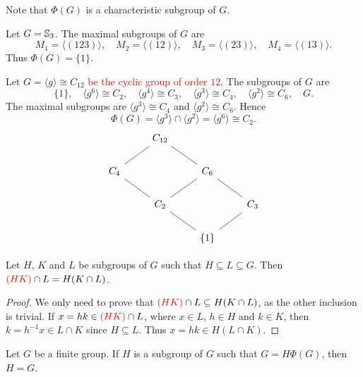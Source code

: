 Note that $\Phi(G)$ is a characteristic subgroup of $G$.


\begin{example}
	Let $G=\mathbb{S}_3$. The maximal subgroups of $G$ are 
	\[
	M_1=\langle (123)\rangle,
	\quad
	M_2=\langle (12)\rangle,
	\quad
	M_3=\langle (23)\rangle,
	\quad
	M_4=\langle (13)\rangle.
	\]
	Thus 
	$\Phi(G)=\{1\}$. 
\end{example}

\begin{example}
	Let $G=\langle g\rangle\cong C_{12}$ \textcolor{red}{be the cyclic group of order $12$}. The subgroups of $G$ are  
	\[
	\{1\},\quad
	\langle g^6\rangle\cong C_2,\quad
	\langle g^4\rangle\cong C_3,\quad
	\langle g^3\rangle\cong C_4,\quad
	\langle g^2\rangle\cong C_6,\quad
	G.
	\]
	The maximal subgroups are $\langle g^3\rangle\cong C_4$ and $\langle
	g^2\rangle\cong C_6$. Hence \[
	\Phi(G)=\langle g^3\rangle\cap \langle
	g^2\rangle=\langle g^6\rangle\cong C_2.
	\] 
\[\begin{tikzcd}
	& {C_{12}} \\
	{C_4} && {C_6} \\
	& {C_2} && {C_3} \\
	&& {\{1\}}
	\arrow[no head, from=4-3, to=3-2]
	\arrow[no head, from=4-3, to=3-4]
	\arrow[no head, from=3-4, to=2-3]
	\arrow[no head, from=2-3, to=1-2]
	\arrow[no head, from=3-2, to=2-1]
	\arrow[no head, from=2-1, to=1-2]
	\arrow[no head, from=3-2, to=2-3]
\end{tikzcd}\]
\end{example}


\begin{lemma}[Dedekind]
	\label{lem:Dedekind}
	Let $H$, $K$ and $L$ be subgroups of $G$ such that $H\subseteq L\subseteq G$. Then
	$\textcolor{red}{(HK)}\cap L=H(K\cap L)$.
\end{lemma}

\begin{proof}
	We only need to prove that $\textcolor{red}{(HK)}\cap L\subseteq H(K\cap L)$, 
	as the other inclusion is trivial. If 
	$x=hk\in \textcolor{red}{(HK)}\cap L$, where $x\in L$, $h\in H$ and $k\in K$,
	then $k=h^{-1}x\in L\cap K$ since $H\subseteq L$. Thus $x=hk\in H(L\cap
	K)$.
\end{proof}

\begin{lemma}
	\label{lem:G=HPhi(G)}
	Let $G$ be a finite group. If $H$ is a subgroup of $G$ such that $G=H\Phi(G)$,
	then $H=G$.
\end{lemma}

